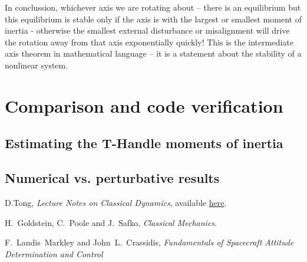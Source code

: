 \documentclass[a4paper]{article}
\begin{document}
	In conclussion, whichever axis we are rotating about -- there is an equilibrium but this equilibrium is stable only if the axis is with the largest or smallest moment of inertia - otherwise the smallest external disturbance or misalignment will drive the rotation away from that axis exponentially quickly!
	This is the intermediate axis theorem in mathematical language -- it is a statement about the stability of a nonlinear system. 
	
	\section{Comparison and code verification}
	\subsection{Estimating the T-Handle moments of inertia}
	\subsection{Numerical vs. perturbative results}
	
	\begin{thebibliography}{9}

	D.Tong, \textit{Lecture Notes on Classical Dynamics}, available \href{http://www.damtp.cam.ac.uk/user/tong/dynamics/clas.pdf}{here}.

	H.~Goldstein, C.~Poole and J.~Safko, \textit{Classical Mechanics}.
	
	F.~Landis~Markley and John~L.~Crassidis, \textit{Fundamentals of Spacecraft Attitude Determination and Control}



	\end{thebibliography}
\end{document}

